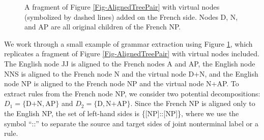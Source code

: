 \documentclass[11pt]{article}
\begin{document}
\begin{figure}[tbh!]
\begin{center}
\end{center}
\caption{\label{Fig-x} A fragment of Figure \ref{Fig-AlignedTreePair} with virtual nodes (symbolized by dashed lines) added on the French side.  Nodes D, N, and AP are all original children of the French NP.}
\end{figure}

We work through a small example of grammar extraction using Figure \ref{Fig-x}, which replicates a fragment of Figure \ref{Fig-AlignedTreePair} with virtual nodes included.  The English node JJ is aligned to the French nodes A and AP, the English node NNS is aligned to the French node N and the virtual node D+N, and the English node NP is aligned to the French node NP and the virtual node N+AP. To extract rules from the French node NP, we consider two potential decompositions: $D_1 = \{\text{D+N}, \text{AP}\}$ and $D_2 = \{\text{D}, \text{N+AP}\}$. Since the French NP is aligned only to the English NP, the set of left-hand sides is \{[NP]::[NP]\}, where we use the symbol ``::'' to separate the source and target sides of joint nonterminal label or a rule. 
\end{document}
